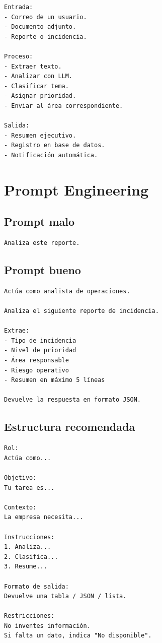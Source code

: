 \documentclass[12pt]{article}
\begin{document}
\begin{lstlisting}
Entrada:
- Correo de un usuario.
- Documento adjunto.
- Reporte o incidencia.

Proceso:
- Extraer texto.
- Analizar con LLM.
- Clasificar tema.
- Asignar prioridad.
- Enviar al área correspondiente.

Salida:
- Resumen ejecutivo.
- Registro en base de datos.
- Notificación automática.
\end{lstlisting}

\section{Prompt Engineering}

\subsection{Prompt malo}

\begin{lstlisting}
Analiza este reporte.
\end{lstlisting}

\subsection{Prompt bueno}

\begin{lstlisting}
Actúa como analista de operaciones.

Analiza el siguiente reporte de incidencia.

Extrae:
- Tipo de incidencia
- Nivel de prioridad
- Área responsable
- Riesgo operativo
- Resumen en máximo 5 líneas

Devuelve la respuesta en formato JSON.
\end{lstlisting}

\subsection{Estructura recomendada}

\begin{lstlisting}
Rol:
Actúa como...

Objetivo:
Tu tarea es...

Contexto:
La empresa necesita...

Instrucciones:
1. Analiza...
2. Clasifica...
3. Resume...

Formato de salida:
Devuelve una tabla / JSON / lista.

Restricciones:
No inventes información.
Si falta un dato, indica "No disponible".
\end{lstlisting}
\end{document}
